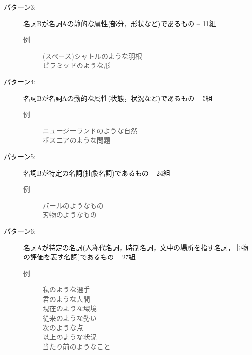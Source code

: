 \medskip
\begin{description}
  \item[パターン3:] 名詞Bが名詞Aの静的な属性(部分，形状など)であるもの -- 11組
\end{description}
\begin{quote}
\begin{description}
  \item[例:] (スペース)シャトルのような羽根 \\ ピラミッドのような形
\end{description}
\end{quote}

\medskip
\begin{description}
  \item[パターン4:] 名詞Bが名詞Aの動的な属性(状態，状況など)であるもの -- 5組
\end{description}
\begin{quote}
\begin{description}
  \item[例:] ニュージーランドのような自然 \\ ボスニアのような問題
\end{description}
\end{quote}

\medskip
\begin{description}
  \item[パターン5:] 名詞Bが特定の名詞(抽象名詞)であるもの -- 24組
\end{description}
\begin{quote}
\begin{description}
  \item[例:] バールのようなもの \\ 刃物のようなもの
\end{description}
\end{quote}

\medskip
\begin{description}
  \item[パターン6:] 名詞Aが特定の名詞(人称代名詞，時制名詞，文中の場所を指す名詞，事物の評価を表す名詞)であるもの -- 27組
\end{description}
\begin{quote}
\begin{description}
  \item[例:] 私のような選手 \\ 君のような人間 \\ 現在のような環境 \\ 従来のような勢い \\ 次のような点 \\ 以上のような状況 \\ 当たり前のようなこと
\end{description}
\end{quote}


